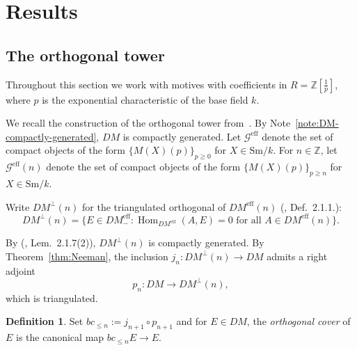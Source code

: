 \documentclass[12pt,a4paper]{article}
\theoremstyle{definition}
\newtheorem{definition}[theorem]{Definition}
\newcommand{\Sm}{\mathrm{Sm}}
\newcommand{\DMeff}{DM^{\mathrm{eff}}_{-}}
\newcommand{\Hom}{\operatorname{Hom}}
\newcommand{\Z}{\mathbb{Z}}
\begin{document}
\section{Results}

\subsection{The orthogonal tower}

Throughout this section we work with motives with coefficients in $R=\Z[\tfrac{1}{p}]$,
where $p$ is the exponential characteristic of the base field $k$.

We recall the construction of the orthogonal tower from~\cite{Pel17}.  By
Note~\ref{note:DM-compactly-generated}, $DM$ is compactly generated.  Let
$\mathcal{G}^{\mathrm{eff}}$ denote the set of compact objects of the form
$\{M(X)(p)\}_{p\geq 0}$ for $X\in\Sm/k$.  For $n\in\Z$, let
$\mathcal{G}^{\mathrm{eff}}(n)$ denote the set of compact objects of the form
$\{M(X)(p)\}_{p\geq n}$ for $X\in\Sm/k$.

Write $DM^\perp(n)$ for the triangulated orthogonal of $DM^{\mathrm{eff}}(n)$
(\cite{Pel17}, Def.\ 2.1.1.):
\[
  DM^\perp(n) = \bigl\{E\in\DMeff : \Hom_{DM^{\mathrm{eff}}}(A,E)=0
    \text{ for all }A\in DM^{\mathrm{eff}}(n)\bigr\}.
\]

By (\cite{Pel17}, Lem.\ 2.1.7(2)), $DM^\perp(n)$ is compactly generated.  By
Theorem~\ref{thm:Neeman}, the inclusion $j_n:DM^\perp(n)\to DM$ admits a right
adjoint
\[
  p_n : DM\longrightarrow DM^\perp(n),
\]
which is triangulated.

\begin{definition}\label{def:orthogonal-cover}
Set $bc_{\leq n}:=j_{n+1}\circ p_{n+1}$ and for $E\in DM$, the \emph{orthogonal
cover} of $E$ is the canonical map $bc_{\leq n}E\to E$.
\end{definition}
\end{document}
